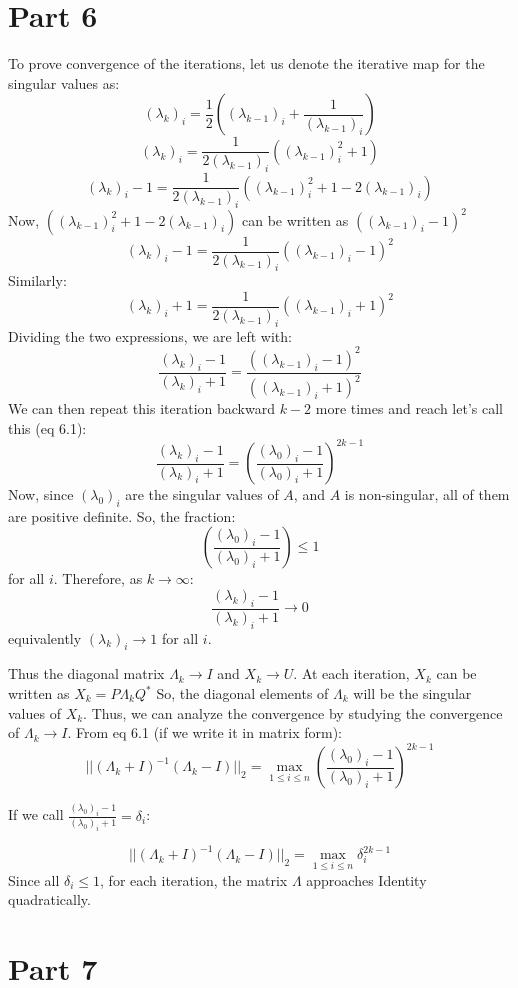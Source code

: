 \documentclass{article}
\begin{document}
\newpage
\section{Part 6}
To prove convergence of the iterations, let us denote the iterative map for the singular values as:
\[(\lambda_{k})_i = \frac{1}{2}((\lambda_{k-1})_i + \frac{1}{(\lambda_{k-1})_i})\]
\[(\lambda_{k})_i = \frac{1}{2(\lambda_{k-1})_i}((\lambda_{k-1})^2_i + 1)\]
\[(\lambda_{k})_i - 1 = \frac{1}{2(\lambda_{k-1})_i}((\lambda_{k-1})^2_i + 1 - 2(\lambda_{k-1})_i)\]
Now, $((\lambda_{k-1})^2_i + 1 - 2(\lambda_{k-1})_i)$ can be written as $((\lambda_{k-1})_i - 1)^2$
\[(\lambda_{k})_i - 1 = \frac{1}{2(\lambda_{k-1})_i}((\lambda_{k-1})_i - 1)^2\]
Similarly:
\[(\lambda_{k})_i + 1 = \frac{1}{2(\lambda_{k-1})_i}((\lambda_{k-1})_i + 1)^2\]
Dividing the two expressions, we are left with:
\[\frac{(\lambda_{k})_i - 1}{(\lambda_{k})_i + 1} = \frac{((\lambda_{k-1})_i - 1)^2}{((\lambda_{k-1})_i + 1)^2}\]
We can then repeat this iteration backward $k-2$ more times and reach let's call this (eq 6.1):
\[\frac{(\lambda_{k})_i - 1}{(\lambda_{k})_i + 1} = \left( \frac{(\lambda_{0})_i - 1}{(\lambda_{0})_i + 1} \right)^{2k-1}\]
Now, since $(\lambda_0)_i$ are the singular values of $A$, and $A$ is non-singular, all of them are positive definite. So, the fraction:
\[\left( \frac{(\lambda_{0})_i - 1}{(\lambda_{0})_i + 1} \right) \leq 1\] 
for all $i$. Therefore, as $k\to\infty$:
\[\frac{(\lambda_{k})_i - 1}{(\lambda_{k})_i + 1} \to 0\] equivalently $(\lambda_k)_i \to 1$ for all $i$.

Thus the diagonal matrix $\Lambda_k \to I$ and $X_k \to U$. 
At each iteration, $X_k$ can be written as $X_k = P \Lambda_k Q^*$
So, the diagonal elements of $\Lambda_k$ will be the singular values of $X_k$. Thus, we can analyze the convergence by studying the convergence of $\Lambda_k \to I$. From eq 6.1 (if we write it in matrix form):
\[||(\Lambda_k + I)^{-1} (\Lambda_k - I)||_2 = \max\limits_{1\leq i \leq n}\left( \frac{(\lambda_{0})_i - 1}{(\lambda_{0})_i + 1} \right)^{2k-1}\]

If we call $\frac{(\lambda_{0})_i - 1}{(\lambda_{0})_i + 1} = \delta_i$:

\[||(\Lambda_k + I)^{-1} (\Lambda_k - I)||_2 = \max\limits_{1\leq i \leq n}\delta_i^{2k-1}\]
Since all $\delta_i \leq 1$, for each iteration, the matrix $\Lambda$ approaches Identity quadratically.

\newpage
\section{Part 7}
\end{document}
